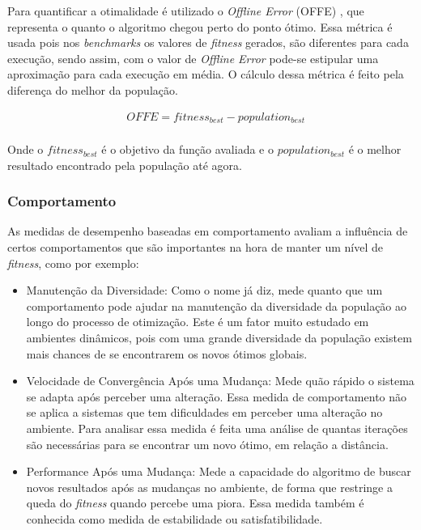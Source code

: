 Para quantificar a otimalidade é utilizado o \textit{Offline Error} (OFFE) \cite{offlineError}, que representa o quanto o algoritmo chegou perto do ponto ótimo. Essa métrica é usada pois nos \textit{benchmarks} os valores de \textit{fitness} gerados, são diferentes para cada execução, sendo assim, com o valor de \textit{Offline Error} pode-se estipular uma aproximação para cada execução em média. O cálculo dessa métrica é feito pela diferença do melhor da população.

\begin{equation}
\label{eq:offline_error}
\begin{split}
& OFFE = fitness_{best} - population_{best} \\
\end{split}
\end{equation}

Onde o $fitness_{best}$ é o objetivo da função avaliada e o $population_{best}$ é o melhor resultado encontrado pela população até agora.

\subsubsection{Comportamento}
As medidas de desempenho baseadas em comportamento avaliam a influência de certos comportamentos que são importantes na hora de manter um nível de \textit{fitness}, como por exemplo:

\begin{itemize}
\item Manutenção da Diversidade: Como o nome já diz, mede quanto que um comportamento pode ajudar na manutenção da diversidade da população ao longo do processo de otimização. Este é um fator muito estudado em ambientes dinâmicos, pois com uma grande diversidade da população existem mais chances de se encontrarem os novos ótimos globais.

\item Velocidade de Convergência Após uma Mudança: Mede quão rápido o sistema se adapta após perceber uma alteração. Essa medida de comportamento não se aplica a sistemas que tem dificuldades em perceber uma alteração no ambiente. Para analisar essa medida é feita uma análise de quantas iterações são necessárias para se encontrar um novo ótimo, em relação a distância.

\item Performance Após uma Mudança: Mede a capacidade do algoritmo de buscar novos resultados após as mudanças no ambiente, de forma que restringe a queda do \textit{fitness} quando percebe uma piora. Essa medida também é conhecida como medida de estabilidade ou satisfatibilidade.
\end{itemize}

